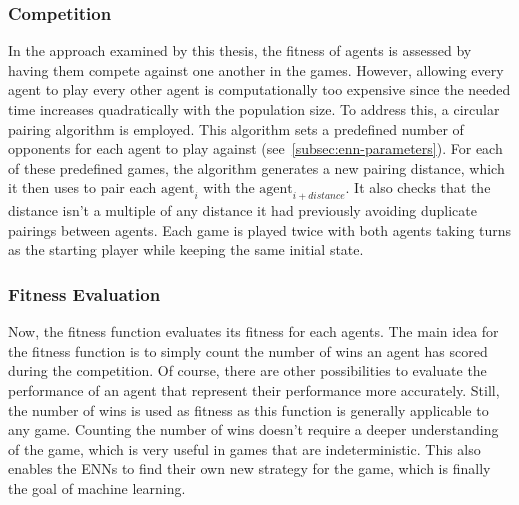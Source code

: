 \documentclass[11pt]{report}
\begin{document}
\begin{enumerate}
    \subsubsection{Competition}
    In the approach examined by this thesis, the fitness of agents is assessed by having them compete against one another in the games.
    However, allowing every agent to play every other agent is computationally too expensive since the needed time increases quadratically with the population size.
    To address this, a circular pairing algorithm is employed.
    This algorithm sets a predefined number of opponents for each agent to play against (see~\ref{subsec:enn-parameters}).
    For each of these predefined games, the algorithm generates a new pairing distance, which it then uses to pair each $\textrm{agent}_i$ with the $\textrm{agent}_{i+distance}$.
    It also checks that the distance isn't a multiple of any distance it had previously avoiding duplicate pairings between agents.
    Each game is played twice with both agents taking turns as the starting player while keeping the same initial state.

    \subsubsection{Fitness Evaluation}
    Now, the fitness function evaluates its fitness for each agents.
    The main idea for the fitness function is to simply count the number of wins an agent has scored during the competition.
    Of course, there are other possibilities to evaluate the performance of an agent that represent their performance more accurately.
    Still, the number of wins is used as fitness as this function is generally applicable to any game.
    Counting the number of wins doesn't require a deeper understanding of the game, which is very useful in games that are indeterministic.
    This also enables the ENNs to find their own new strategy for the game, which is finally the goal of machine learning.


\end{enumerate}
\end{document}
